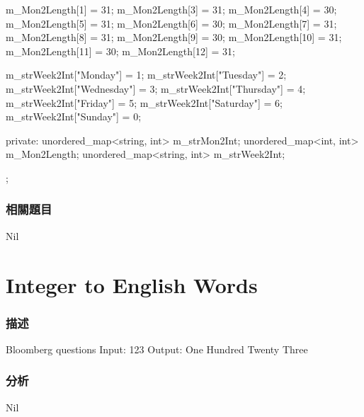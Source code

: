 \begin{Code}
{{        m_Mon2Length[1] = 31;
        m_Mon2Length[3] = 31;
        m_Mon2Length[4] = 30;
        m_Mon2Length[5] = 31;
        m_Mon2Length[6] = 30;
        m_Mon2Length[7] = 31;
        m_Mon2Length[8] = 31;
        m_Mon2Length[9] = 30;
        m_Mon2Length[10] = 31;
        m_Mon2Length[11] = 30;
        m_Mon2Length[12] = 31;

        m_strWeek2Int["Monday"] = 1;
        m_strWeek2Int["Tuesday"] = 2;
        m_strWeek2Int["Wednesday"] = 3;
        m_strWeek2Int["Thursday"] = 4;
        m_strWeek2Int["Friday"] = 5;
        m_strWeek2Int["Saturday"] = 6;
        m_strWeek2Int["Sunday"] = 0;
    }
private:
    unordered_map<string, int> m_strMon2Int;
    unordered_map<int, int> m_Mon2Length;
    unordered_map<string, int> m_strWeek2Int;
};
\end{Code}


\subsubsection{相關題目}
Nil

\section{Integer to English Words} %
\label{sec:integer-to-english-words}

\subsubsection{描述}
Bloomberg questions
\newline
Input: 123\newline
Output: One Hundred Twenty Three\newline

\subsubsection{分析}
Nil


